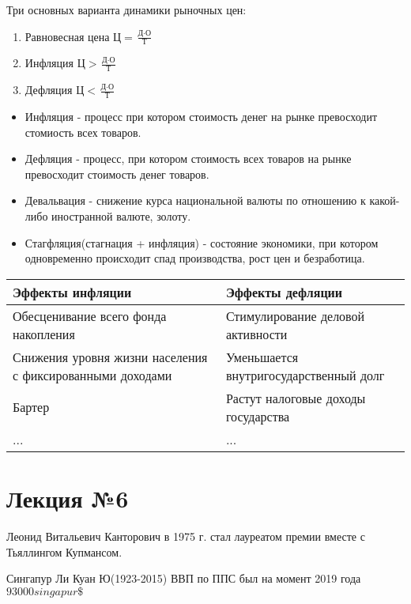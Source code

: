 \documentclass[a4paper, 12pt]{article}
\begin{document}
	Три основных варианта динамики рыночных цен:
	\begin{enumerate}
		\item Равновесная цена $\text{Ц} = \frac{\text{Д} \cdot \text{О}}{\text{Т}}$
		\item Инфляция $\text{Ц} > \frac{\text{Д} \cdot \text{О}}{\text{Т}}$
		\item Дефляция $\text{Ц} < \frac{\text{Д} \cdot \text{О}}{\text{Т}}$
	\end{enumerate}

	\begin{itemize}
		\item Инфляция - процесс при котором стоимость денег на рынке превосходит стомиость всех товаров.
		\item Дефляция - процесс, при котором стоимость всех товаров на рынке превосходит стоимость денег товаров.
		\item Девальвация  - снижение курса национальной валюты по отношению к какой-либо иностранной валюте, золоту.
		\item Стагфляция(стагнация + инфляция) - состояние экономики, при котором одновременно происходит спад производства, рост цен и безработица.
	\end{itemize}

	\begin{center}
		\begin{tabular}{ | m{10em} | m{10em} | }
			\hline
			Эффекты инфляции & Эффекты дефляции \\
			\hline
			Обесценивание всего фонда накопления & Стимулирование деловой активности \\
			\hline
			Снижения уровня жизни населения с фиксированными доходами & Уменьшается внутригосударственный долг \\
			\hline
			Бартер & Растут налоговые доходы государства \\
			\hline
			... & ... \\
			\hline
		\end{tabular}
	\end{center}

	\part*{Лекция №6}
	
	Леонид Витальевич Канторович в 1975 г. стал лауреатом премии вместе с Тьяллингом Купмансом.
	
	Сингапур
	Ли Куан Ю(1923-2015)
	ВВП по ППС был на момент 2019 года $93000 singapur\$$
	
\end{document}
